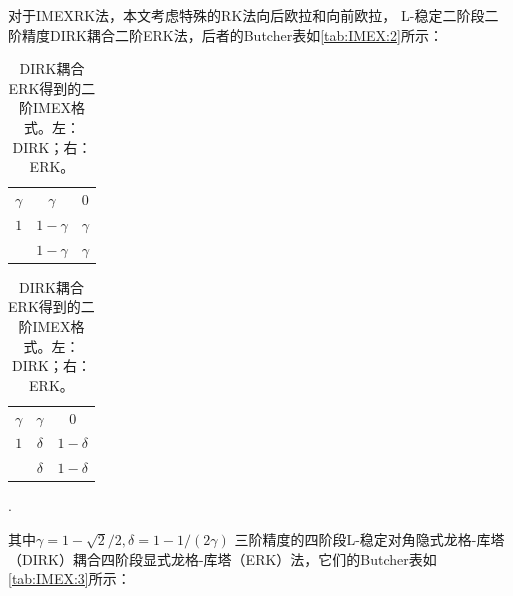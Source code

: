 对于IMEXRK法，本文考虑特殊的RK法向后欧拉和向前欧拉，
L-稳定二阶段二阶精度DIRK耦合二阶ERK法\cite{ascher1997implicitexplicita}，后者的Butcher表如\autoref{tab:IMEX:2}所示：
\begin{table}
    \centering
    \begin{minipage}{0.45\linewidth}
        \centering
        \begin{tabular}{c|cc}
            $\gamma$ & $\gamma$   & $0$      \\
            $1$      & $1-\gamma$ & $\gamma$ \\
                     & $1-\gamma$ & $\gamma$
        \end{tabular}
    \end{minipage}
    \begin{minipage}{0.45\linewidth}
        \centering
        \begin{tabular}{c|cc}
            $\gamma$ & $\gamma$ & $0$         \\
            $1$      & $\delta$ & $1- \delta$ \\
                     & $\delta$ & $1-\delta$
        \end{tabular}.
    \end{minipage}
    \caption{DIRK耦合ERK得到的二阶IMEX格式。左：DIRK；右：ERK。}
    \label{tab:IMEX:2}
\end{table}
其中$\gamma=1- \sqrt{2}/2,\delta = 1- 1/(2\gamma)$
三阶精度的四阶段L-稳定对角隐式龙格-库塔（DIRK）耦合四阶段显式龙格-库塔（ERK）法\cite{ascher1997implicitexplicita}，它们的Butcher表如\autoref{tab:IMEX:3}所示：
